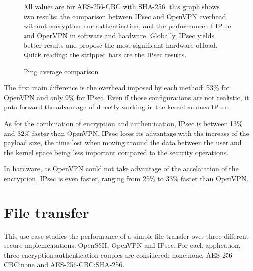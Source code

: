 \begin{figure}[ht]

\caption{Ping average comparison}{All values are for AES-256-CBC with SHA-256. this graph shows two results: the comparison between IPsec and OpenVPN overhead without encryption nor authentication, and the performance of IPsec and OpenVPN in software and hardware. Globally, IPsec yields better results and propose the most significant hardware offload. Quick reading: the stripped bars are the IPsec results.}
\label{fig:ping-benchmark-comparison}
\end{figure}

The first main difference is the overhead imposed by each method: 53\% for OpenVPN and only 9\% for IPsec.
Even if those configurations are not realistic, it puts forward the advantage of directly working in the kernel as does IPsec.

As for the combination of encryption and authentication, IPsec is between 13\% and 32\% faster than OpenVPN.
IPsec loses its advantage with the increase of the payload size, the time lost when moving around the data between the user and the kernel space being less important compared to the security operations.

\noindent In hardware, as OpenVPN could not take advantage of the accelaration of the encryption, IPsec is even faster, ranging from 25\% to 33\% faster than OpenVPN.














\section{File transfer}

This use case studies the performance of a simple file transfer over three different secure implementations: OpenSSH, OpenVPN and IPsec.
For each application, three encryption:authentication couples are considered: none:none, AES-256-CBC:none and AES-256-CBC:SHA-256. 

